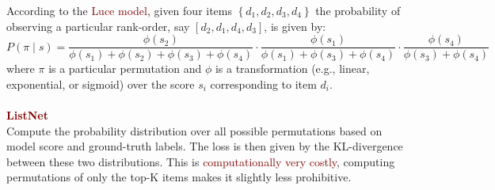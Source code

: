\vspace{0.75cm}

According to the \textcolor{Maroon}{Luce model}, given four items $\left\{d_{1}, d_{2}, d_{3}, d_{4}\right\}$ the probability of observing a particular rank-order, say $\left[d_{2}, d_{1}, d_{4}, d_{3}\right]$, is given by:
$$
P(\pi \mid s)=\frac{\phi\left(s_{2}\right)}{\phi\left(s_{1}\right)+\phi\left(s_{2}\right)+\phi\left(s_{3}\right)+\phi\left(s_{4}\right)} \cdot \frac{\phi\left(s_{1}\right)}{\phi\left(s_{1}\right)+\phi\left(s_{3}\right)+\phi\left(s_{4}\right)} \cdot \frac{\phi\left(s_{4}\right)}{\phi\left(s_{3}\right)+\phi\left(s_{4}\right)}
$$
where $\pi$ is a particular permutation and $\phi$ is a transformation (e.g., linear, exponential, or sigmoid) over the score $s_{i}$ corresponding to item $d_{i}$. \\
\\
{\Large \textbf{\textcolor{Maroon}{ListNet}}}  \\
Compute the probability distribution over all possible permutations based on model score and ground-truth labels. The loss is then given by the KL-divergence between these two distributions. This is \textcolor{Maroon}{computationally very costly}, computing permutations of only the top-K items makes it slightly less prohibitive. \\
\\

